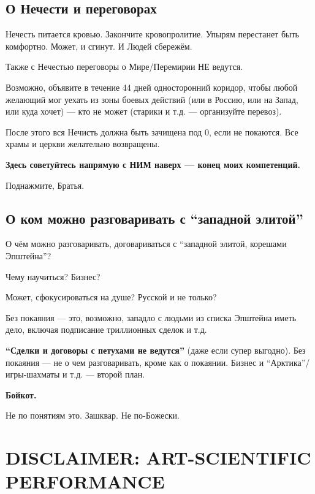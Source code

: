 \documentclass[11pt,a4paper]{article}
\theoremstyle{definition}
\theoremstyle{remark}
\begin{document}
{\subsection{О Нечести и переговорах}

Нечесть питается кровью. Закончите кровопролитие. Упырям перестанет быть комфортно. 
Может, и сгинут. И Людей сбережём.

Также с Нечестью переговоры о Мире/Перемирии НЕ ведутся.

Возможно, объявите в течение 44 дней односторонний коридор, чтобы любой желающий 
мог уехать из зоны боевых действий (или в Россию, или на Запад, или куда хочет) — 
кто не может (старики и т.д. — организуйте перевоз).

После этого вся Нечисть должна быть зачищена под 0, если не покаются. Все храмы и 
церкви желательно возвращены.

\textbf{Здесь советуйтесь напрямую с НИМ наверх — конец моих компетенций.}

Поднажмите, Братья.

\subsection{О ком можно разговаривать с ``западной элитой''}

О чём можно разговаривать, договариваться с ``западной элитой, корешами Эпштейна''?

Чему научиться? Бизнес?

Может, сфокусироваться на душе? Русской и не только?

Без покаяния — это, возможно, западло с людьми из списка Эпштейна иметь дело, 
включая подписание триллионных сделок и т.д.

\textbf{``Сделки и договоры с петухами не ведутся''} (даже если супер выгодно). 
Без покаяния — не о чем разговаривать, кроме как о покаянии. Бизнес и ``Арктика''/
игры-шахматы и т.д. — второй план.

\textbf{Бойкот.}

Не по понятиям это. Зашквар. Не по-Божески.

} %

\section{DISCLAIMER: ART-SCIENTIFIC PERFORMANCE}
\label{app:disclaimer}
\end{document}
